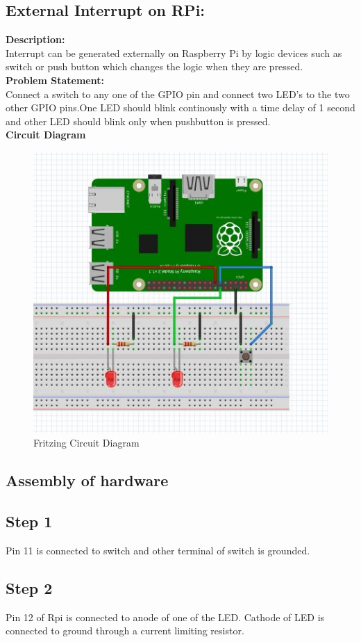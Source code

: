 \documentclass[a4paper,12pt,oneside]{book}
\begin{document}
\subsection*{External Interrupt on RPi:}
\textbf{Description:} \\
Interrupt can be generated externally on Raspberry Pi by logic devices such as switch or push button which changes the logic when they are pressed. \\
\textbf{Problem Statement:} \\
Connect a switch to any one of the GPIO pin and connect two LED's to the two other GPIO pins.One LED should blink continously with a time delay of 1 second and other LED should blink only when pushbutton is pressed.\\
\textbf{Circuit Diagram}  \\
\begin{figure}[H]
    \centering
    \includegraphics[scale = 0.6]{switch_interrupt}
    \caption{Fritzing Circuit Diagram}
\end{figure}
\subsection*{Assembly of hardware}
\subsection*{Step 1}
Pin 11 is connected to switch and other terminal of switch is grounded.
\subsection*{Step 2}
Pin 12 of Rpi is connected to anode of one of the LED. Cathode of LED is connected to ground through a current limiting resistor.
\end{document}
